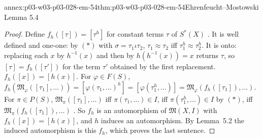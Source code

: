 \begin{annexitem}{annex:p03-w03-p03-028-em-54}{thm:p03-w03-p03-028-em-54}{Ehrenfeucht--Mostowski Lemma 5.4}
\begin{proof}
Define \(f_h([\tau])=[\tau^h]\) for constant terms \(\tau\) of \(S^*(X)\)
\cite[p.~58]{EhrenfeuchtMostowski1956}.  It is well defined and one-one: by
\((\ast)\) with \(\sigma=\tau_1\iota\tau_2\), \(\tau_1\approx\tau_2\) iff
\(\tau_1^h\approx\tau_2^h\).  It is onto: replacing each \(x\) by
\(h^{-1}(x)\) and then by \(h(h^{-1}(x))=x\) returns \(\tau\), so
\([\tau]=f_h([\tau'])\) for the term \(\tau'\) obtained by the first
replacement.  \(f_h([x])=[h(x)]\).  For \(\varphi\in F(S)\),
\(f_h(\mathfrak M_\varphi([\tau_1],\ldots))=[\varphi(\tau_1,\ldots)^h]
=[\varphi(\tau_1^h,\ldots)]=\mathfrak M_\varphi(f_h([\tau_1]),\ldots)\).  For
\(\pi\in P(S)\), \(\mathfrak M_\pi([\tau_1],\ldots)\) iff
\(\pi(\tau_1,\ldots)\in I\), iff \(\pi(\tau_1^h,\ldots)\in I\) by \((\ast)\), iff
\(\mathfrak M_\pi(f_h([\tau_1]),\ldots)\) \cite[p.~59]{EhrenfeuchtMostowski1956}.
So \(f_h\) is an automorphism of \(\mathfrak M(X,I)\) with
\(f_h([x])=[h(x)]\), and \(h\) induces an automorphism.  By Lemma~5.2 the
induced automorphism is this \(f_h\), which proves the last sentence.
\end{proof}
\end{annexitem}

